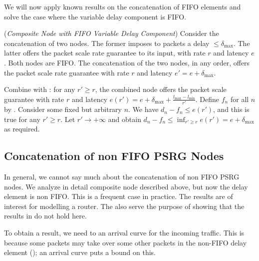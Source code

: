 We will now apply known results on the concatenation of FIFO
elements and solve the case where the variable delay component
is FIFO.
\begin{theorem}(\emph{Composite Node with FIFO Variable Delay Component})
 Consider the concatenation of two nodes.
The former imposes to packets a delay  $\leq \delta_{\max}$.
The latter offers the packet scale rate guarantee to its
input, with rate $r$ and latency $e$. Both nodes are FIFO. The
concatenation of the two nodes, in any order, offers the
packet scale rate guarantee with rate $r$ and latency $e'=e
+\delta_{\max}$.
\end{theorem}
\begin{preuve} Combine  with
: for any $r' \geq r$, the combined node
offers the packet scale guarantee with rate $r$ and latency
$e(r')=e + \delta_{\max} + \frac{l_{\max}-l_{\min}}{r'}$.
Define $f_n$ for all $n$ by . Consider some
fixed but arbitrary $n$. We have $d_n - f_n \leq e(r')$, and
this is true for any $r'\geq r$. Let $r' \rightarrow +\infty$
and obtain $d_n - f_n \leq \inf_{r' \geq r} e(r') = e +
\delta_{\max}$ as required.
\end{preuve}

\subsection{Concatenation of non FIFO PSRG Nodes}
In general, we cannot say much about the concatenation of non
FIFO PSRG nodes. We analyze in detail composite node described
above,  but now the delay element is non FIFO. This is a
frequent case in practice. The results are of interest for
modelling a router. The also serve the purpose of showing that
the results in  do not hold here.

To obtain a result, we need to an arrival curve for the
incoming traffic. This is because some packets may take over
some other packets in the non-FIFO delay element
(); an arrival curve puts a bound on this.

\begin{figure}[!htbp]
\end{figure}

